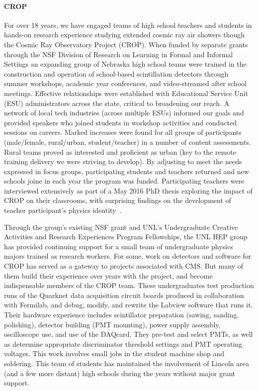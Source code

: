 \paragraph{CROP}
For over 18 years, we have engaged teams of high school teachers and students in hands-on research experience studying extended cosmic ray air showers though the Cosmic Ray Observatory Project (CROP). When funded by separate grants through the NSF Division of Research on Learning in Formal and Informal Settings an expanding group of Nebraska high school teams were trained in the construction and operation of school-based scintillation detectors through summer workshops, academic year conferences, and video-streamed after school meetings. Effective relationships were established with Educational Service Unit (ESU) administrators across the state, critical to broadening our reach. A network of local tech industries (across multiple ESUs) informed our goals and provided speakers who joined students in workshop activities and conducted sessions on careers. Marked increases were found for all groups of participants (male/female, rural/urban, student/teacher) in a number of content assessments. Rural teams proved as interested and proficient as urban (key to the remote training delivery we were striving to develop). By adjusting to meet the needs expressed in focus groups, participating students and teachers returned and new schools joine in each year the program was funded.
Participating teachers were interviewed extensively as part of a May 2016 PhD thesis exploring the impact of CROP on their classrooms, with surprising findings on the development of teacher participant’s physics identity~\cite{bib:teacherdevelopment}.

Through the group’s existing NSF grant and UNL's Undergraduate Creative Activities and Research Experiences Program  Fellowships, the UNL HEP group has provided continuing support for a small team of undergraduate physics majors trained as research workers.  For some, work on detectors and software for CROP has served as a gateway to projects associated with CMS.  But many of them build their experience over years with the project, and become indispensable members of the CROP team.  These undergraduates test production runs of the Quarknet data acquisition circuit boards produced in collaboration with Fermilab, and debug, modify, and rewrite the Labview software that runs it.  Their hardware experience includes scintillator preparation (sawing, sanding, polishing), detector building (PMT mounting), power supply assembly, oscilloscope use, and use of the DAQcard. They pre-test and select PMTs, as well as determine appropriate discriminator threshold settings and PMT operating voltages.  This work involves small jobs in the student machine shop and soldering. This team of students has maintained the involvement of Lincoln area (and a few more distant) high schools during the years without major grant support.

